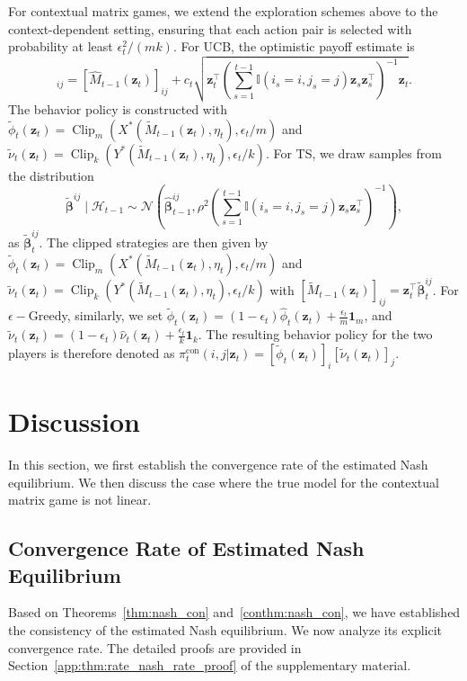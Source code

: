 \documentclass[12pt]{article}
\begin{document}
For contextual matrix games, we extend the exploration schemes above to the context-dependent setting, ensuring that each action pair is selected with probability at least $\epsilon_t^2/(mk)$. For UCB, the optimistic payoff estimate is
\begin{equation*}
[\widetilde M_{t-1}(\bm z_t)]_{ij}
= [\widehat M_{t-1}(\bm z_t)]_{ij} + c_t \sqrt{\bm z_t^\top \left(\sum_{s=1}^{t-1}
\mathbb I(i_s=i,j_s=j)\bm z_s\bm z_s^\top\right)^{-1} \bm z_t}.
\end{equation*}
The behavior policy is constructed with $\widetilde{\phi}_t(\bm z_t)=\operatorname{Clip}_m \left(X^\ast(\widetilde{M}_{t-1}(\bm{z}_t),\eta_t), \epsilon_t/m \right)$ and $\widetilde{\nu}_t(\bm z_t)=\operatorname{Clip}_k \left(Y^\ast(\widetilde{M}_{t-1}(\bm{z}_t),\eta_t), \epsilon_t/k \right)$. For TS, we draw samples from the distribution
\[
\widetilde{\bm\beta}^{ij}
\mid \mathcal H_{t-1}
\sim
\mathcal N\left(
\widehat{\bm\beta}_{t-1}^{ij},
\rho^2 \left(\sum_{s=1}^{t-1} \mathbb I(i_s=i,j_s=j)\bm z_s\bm z_s^\top \right)^{-1}
\right),
\]
as $\widetilde{\bm\beta}_{t}^{ij}$. The clipped strategies are then given by $\widetilde{\phi}_t(\bm z_t)=\operatorname{Clip}_m \left(X^\ast(\widetilde{M}_{t-1}(\bm{z}_t),\eta_t), \epsilon_t/m \right)$ and $\widetilde{\nu}_t(\bm z_t)=\operatorname{Clip}_k \left(Y^\ast(\widetilde{M}_{t-1}(\bm{z}_t),\eta_t), \epsilon_t/k \right)$ with $[\widetilde{M}_{t-1}(\bm{z}_t)]_{ij}=\bm{z}_t^\top \widetilde{\bm{\beta}}^{ij}_{t}$. For $\epsilon-$Greedy, similarly, we set $\widetilde{\phi}_t(\bm z_t) = (1-\epsilon_t)\widehat{\phi}_t(\bm z_t) + \frac{\epsilon_t}{m}\bm{1}_m$, and $\widetilde{\nu}_t(\bm z_t)= (1-\epsilon_t)\widehat{\nu}_t(\bm z_t) + \frac{\epsilon_t}{k}\bm{1}_k$.
The resulting behavior policy for the two players is therefore denoted as ${\pi}_t^{\mathrm{con}}(i,j \vert \bm{z}_t)=[\widetilde{\phi}_t(\bm z_t)]_i [\widetilde{\nu}_t(\bm z_t)]_j$.



\section{Discussion}
\label{app:dis}
In this section, we first establish the convergence rate of the estimated Nash equilibrium. We then discuss the case where the true model for the contextual matrix game is not linear.

\subsection{Convergence Rate of Estimated Nash Equilibrium}
\label{app:con_rate_ne}
Based on Theorems~\ref{thm:nash_con} and~\ref{conthm:nash_con}, we have established the consistency of the estimated Nash equilibrium. We now analyze its explicit convergence rate. The detailed proofs are provided in Section~\ref{app:thm:rate_nash_rate_proof} of the supplementary material.
\end{document}
